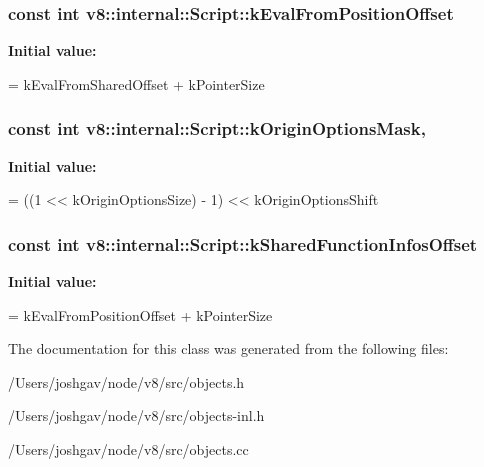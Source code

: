 \subsubsection[{\texorpdfstring{k\+Eval\+From\+Position\+Offset}{kEvalFromPositionOffset}}]{\setlength{\rightskip}{0pt plus 5cm}const int v8\+::internal\+::\+Script\+::k\+Eval\+From\+Position\+Offset\hspace{0.3cm}{\ttfamily [static]}}\hypertarget{classv8_1_1internal_1_1_script_a3f7d8c82e78cb32d8d9e891527a94148}{}\label{classv8_1_1internal_1_1_script_a3f7d8c82e78cb32d8d9e891527a94148}
{\bfseries Initial value\+:}
\begin{DoxyCode}
=
      kEvalFromSharedOffset + kPointerSize
\end{DoxyCode}
\subsubsection[{\texorpdfstring{k\+Origin\+Options\+Mask}{kOriginOptionsMask}}]{\setlength{\rightskip}{0pt plus 5cm}const int v8\+::internal\+::\+Script\+::k\+Origin\+Options\+Mask\hspace{0.3cm}{\ttfamily [static]}, {\ttfamily [private]}}\hypertarget{classv8_1_1internal_1_1_script_a61192b9c3bd8061918f83297ef938b98}{}\label{classv8_1_1internal_1_1_script_a61192b9c3bd8061918f83297ef938b98}
{\bfseries Initial value\+:}
\begin{DoxyCode}
= ((1 << kOriginOptionsSize) - 1)
                                        << kOriginOptionsShift
\end{DoxyCode}
\subsubsection[{\texorpdfstring{k\+Shared\+Function\+Infos\+Offset}{kSharedFunctionInfosOffset}}]{\setlength{\rightskip}{0pt plus 5cm}const int v8\+::internal\+::\+Script\+::k\+Shared\+Function\+Infos\+Offset\hspace{0.3cm}{\ttfamily [static]}}\hypertarget{classv8_1_1internal_1_1_script_a94d43a301690a2d4daa0bc3c0f828600}{}\label{classv8_1_1internal_1_1_script_a94d43a301690a2d4daa0bc3c0f828600}
{\bfseries Initial value\+:}
\begin{DoxyCode}
=
      kEvalFromPositionOffset + kPointerSize
\end{DoxyCode}


The documentation for this class was generated from the following files\+:\begin{DoxyCompactItemize}
\item 
/\+Users/joshgav/node/v8/src/objects.\+h\item 
/\+Users/joshgav/node/v8/src/objects-\/inl.\+h\item 
/\+Users/joshgav/node/v8/src/objects.\+cc\end{DoxyCompactItemize}
